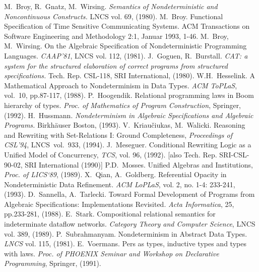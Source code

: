 \begin{thebibliography}{BGW80} \MyLPar
{}M.~Broy, R.~Gnatz, M.~Wirsing. {\em Semantics of 
  Nondeterministic and Noncontinuous Constructs.} LNCS vol. 69, (1980). 
M.~Broy. Functional Specification of Time Sensitive 
  Communicating Systems. 
  ACM Transactions on Software Engineering and Methodology 2:1, Januar 1993, 1-46.
 M.~Broy, M.~Wirsing. On the Algebraic Specification of 
   Nondeterministic Programming Languages. {\em CAAP'81}, LNCS vol. 112, (1981). 
 J.~Goguen, R.~Burstall. {\em CAT: a system for the structured 
  elaboration of correct programs from structured specifications.} 
  Tech. Rep. CSL-118, SRI International, (1980). 
 W.H.~Hesselink. A Mathematical Approach to Nondeterminism
  in Data Types. {\em ACM ToPLaS}, vol.~10, pp.87-117, (1988).
 P.~Hoogendik. Relational programming laws in Boom 
hierarchy of types. {\em Proc. of Mathematics of Program Construction}, Springer, (1992).
 H.~Hussmann.
{\em Nondeterminism in Algebraic Specifications and Algebraic Programs.} Birkh\"auser Boston, (1993).
 V.~Kriau\v ciukas, M.~Walicki. Reasoning and Rewriting 
with Set-Relations I: Ground Completeness, {\em Proceedings of CSL'94},
LNCS~vol.~933, (1994). 
 J.~Meseguer. Conditional Rewriting Logic as a 
Unified Model of Concurrency, {\em TCS}, vol. 96, (1992). [also Tech. Rep. SRI-CSL-90-02, SRI International (1990)] 
 P.D.~Mosses. Unified Algebras and Institutions, 
{\em Proc. of LICS`89}, (1989).
 X.~Qian, A.~Goldberg. Referential Opacity in 
Nondeterministic Data Refinement. {\em ACM LoPLaS}, vol. 2, no. 1-4: 233-241, (1993).
 D.~Sannella, A.~Tarlecki. 
Toward Formal Development of Programs from Algebraic Specifications: Implementations Revisited. {\em Acta Informatica}, 25, pp.233-281, (1988).
 E.~Stark. Compositional relational semantics for indeterminate dataflow networks. {\em Category Theory and Computer Science}, 
LNCS vol. 389, (1989).
 P.~Subrahmanyam. Nondeterminism in Abstract Data Types. 
{\em LNCS} vol. 115, (1981).
 E.~Voermans. Pers as types, inductive types and types with
laws. {\em Proc. of PHOENIX Seminar and Workshop on Declarative Programming}, Springer, (1991).

\end{thebibliography}
